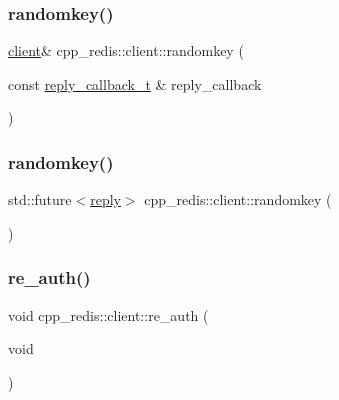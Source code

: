 \mbox{\label{classcpp__redis_1_1client_a7ec81f685738479307e464db273201e6}} 
\subsubsection{\texorpdfstring{randomkey()}{randomkey()}\hspace{0.1cm}{\footnotesize\ttfamily [1/2]}}
{\footnotesize\ttfamily \hyperlink{classcpp__redis_1_1client}{client}\& cpp\+\_\+redis\+::client\+::randomkey (\begin{DoxyParamCaption}\item[{const \hyperlink{classcpp__redis_1_1client_a061a1140d36d2eaeda82b09a0bb3f9f2}{reply\+\_\+callback\+\_\+t} \&}]{reply\+\_\+callback }\end{DoxyParamCaption})}

\mbox{\label{classcpp__redis_1_1client_a021538472ad199d7a203a77af6aba96c}} 
\subsubsection{\texorpdfstring{randomkey()}{randomkey()}\hspace{0.1cm}{\footnotesize\ttfamily [2/2]}}
{\footnotesize\ttfamily std\+::future$<$\hyperlink{classcpp__redis_1_1reply}{reply}$>$ cpp\+\_\+redis\+::client\+::randomkey (\begin{DoxyParamCaption}{ }\end{DoxyParamCaption})}

\mbox{\label{classcpp__redis_1_1client_a89c93f201d057dfa2eb8c7b80ff4f5c9}} 
\subsubsection{\texorpdfstring{re\+\_\+auth()}{re\_auth()}}
{\footnotesize\ttfamily void cpp\+\_\+redis\+::client\+::re\+\_\+auth (\begin{DoxyParamCaption}\item[{void}]{ }\end{DoxyParamCaption})\hspace{0.3cm}{\ttfamily [private]}}

